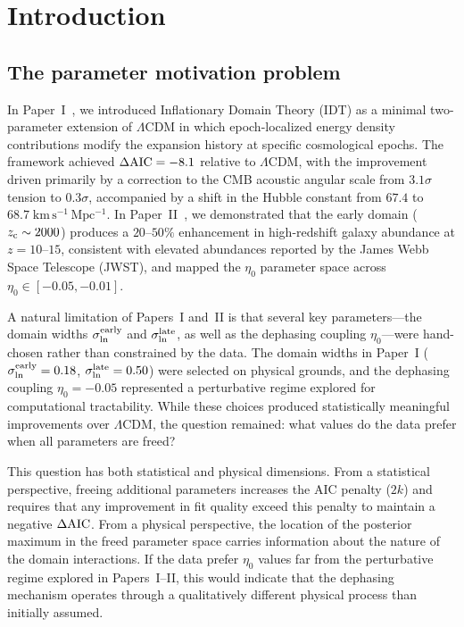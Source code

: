 \documentclass[aps,prd,twocolumn,superscriptaddress,nofootinbib]{revtex4-2}
\newcommand{\zc}{z_{\rm c}}
\newcommand{\sln}{\sigma_{\ln}}
\newcommand{\dAIC}{\Delta{\rm AIC}}
\newcommand{\etaz}{\eta_0}
\begin{document}
\maketitle

\section{Introduction}
\label{sec:intro}

\subsection{The parameter motivation problem}
\label{sec:param_motivation}

In Paper~I~\cite{Paper1}, we introduced Inflationary Domain Theory
(IDT) as a minimal two-parameter extension of $\Lambda$CDM in which
epoch-localized energy density contributions modify the expansion
history at specific cosmological epochs. The framework achieved
$\dAIC = -8.1$ relative to $\Lambda$CDM, with the improvement driven
primarily by a correction to the CMB acoustic angular scale from
$3.1\sigma$ tension to $0.3\sigma$, accompanied by a shift in the
Hubble constant from $67.4$ to
$68.7\;\mathrm{km\,s^{-1}\,Mpc^{-1}}$. In Paper~II~\cite{Paper2}, we
demonstrated that the early domain ($\zc \sim 2000$) produces a
$20$--$50\%$ enhancement in high-redshift galaxy abundance at
$z = 10$--$15$, consistent with elevated abundances reported by the
James Webb Space Telescope (JWST), and mapped the $\etaz$ parameter
space across $\etaz \in [-0.05, -0.01]$.

A natural limitation of Papers~I and~II is that several key
parameters---the domain widths $\sln^{\rm early}$ and $\sln^{\rm
late}$, as well as the dephasing coupling $\etaz$---were hand-chosen
rather than constrained by the data. The domain widths in Paper~I
($\sln^{\rm early} = 0.18$, $\sln^{\rm late} = 0.50$) were selected
on physical grounds, and the dephasing coupling $\etaz = -0.05$
represented a perturbative regime explored for computational
tractability. While these choices produced statistically meaningful
improvements over $\Lambda$CDM, the question remained: what values do
the data prefer when all parameters are freed?

This question has both statistical and physical dimensions. From a
statistical perspective, freeing additional parameters increases the
AIC penalty ($2k$) and requires that any improvement in fit quality
exceed this penalty to maintain a negative $\dAIC$. From a physical
perspective, the location of the posterior maximum in the freed
parameter space carries information about the nature of the domain
interactions. If the data prefer $\etaz$ values far from the
perturbative regime explored in Papers~I--II, this would indicate that
the dephasing mechanism operates through a qualitatively different
physical process than initially assumed.
\end{document}

